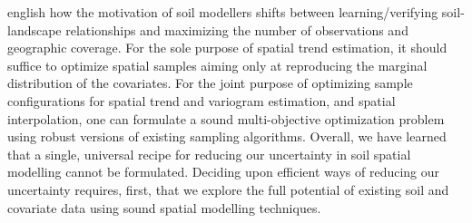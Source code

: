 \documentclass[tese, header, %
twoside, openright,          %
]{UFRuralRJ}
\begin{document}
\begin{generalabstract}{english}{\titleEn}{\keyEn}{\nivelEn}
how the motivation of soil modellers shifts between learning/verifying soil-landscape relationships and 
maximizing the number of observations and geographic coverage. For the sole purpose of spatial trend 
estimation, it should suffice to optimize spatial samples aiming only at reproducing the marginal distribution 
of the covariates. For the joint purpose of optimizing sample configurations for spatial trend and variogram 
estimation, and spatial interpolation, one can formulate a sound multi-objective optimization problem using 
robust versions of existing sampling algorithms. Overall, we have learned that a single, universal recipe for 
reducing our uncertainty in soil spatial modelling cannot be formulated. Deciding upon efficient ways of 
reducing our uncertainty requires, first, that we explore the full potential of existing soil and covariate 
data using sound spatial modelling techniques.
\end{generalabstract}

\listoffigures

\listoftables

\listofappendix

\tableofcontents


\end{document}
